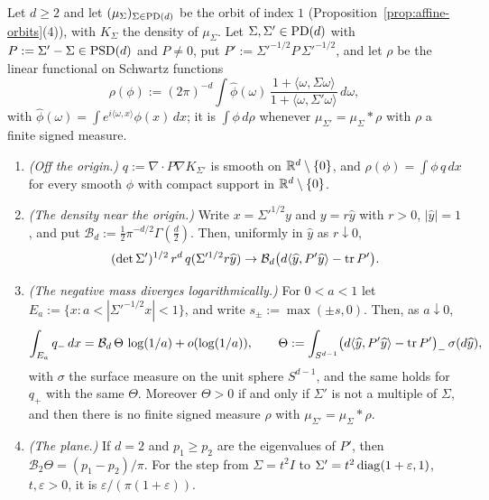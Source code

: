 \begin{proposition}\label{prop:matern-negative-mass}
Let $d \ge 2$ and let $(\mu_\Sigma)_{\Sigma\in\mathrm{PD}(d)}$ be the \Matern{} orbit of index $1$
(Proposition~\ref{prop:affine-orbits}(4)), with $K_\Sigma$ the density of $\mu_\Sigma$. Let
$\Sigma, \Sigma' \in \mathrm{PD}(d)$ with $P := \Sigma' - \Sigma \in \mathrm{PSD}(d)$ and $P \ne 0$, put
$P' := \Sigma'^{-1/2}P\,\Sigma'^{-1/2}$, and let $\rho$ be the linear functional on Schwartz
functions
\[
  \rho(\phi) := (2\pi)^{-d}\int\widehat\phi(\omega)\,
   \frac{1 + \langle\omega,\Sigma\omega\rangle}{1 + \langle\omega,\Sigma'\omega\rangle}\,d\omega ,
\]
with $\widehat\phi(\omega) = \int e^{i\langle\omega,x\rangle}\phi(x)\,dx$; it is $\int\phi\,d\rho$
whenever $\mu_{\Sigma'} = \mu_\Sigma * \rho$ with $\rho$ a finite signed measure.
\begin{enumerate}
\item \emph{(Off the origin.)} $q := \nabla\cdot P\nabla K_{\Sigma'}$ is smooth on
$\mathbb{R}^d \setminus \{0\}$, and $\rho(\phi) = \int\phi\,q\,dx$ for every smooth $\phi$ with compact
support in $\mathbb{R}^d \setminus \{0\}$.
\item \emph{(The density near the origin.)} Write $x = \Sigma'^{1/2}y$ and $y = r\widehat y$ with
$r > 0$, $|\widehat y| = 1$, and put $\mathcal{B}_d := \tfrac12\pi^{-d/2}\Gamma(\tfrac d2)$. Then,
uniformly in $\widehat y$ as $r \downarrow 0$,
\[
  (\det\Sigma')^{1/2}\,r^d\,q(\Sigma'^{1/2}r\widehat y) \to
  \mathcal{B}_d\bigl(d\langle\widehat y,P'\widehat y\rangle - \operatorname{tr} P'\bigr) .
\]
\item \emph{(The negative mass diverges logarithmically.)} For $0 < a < 1$ let
$E_a := \{x : a < |\Sigma'^{-1/2}x| < 1\}$, and write $s_\pm := \max(\pm s, 0)$. Then, as
$a \downarrow 0$,
\[
  \int_{E_a}q_-\,dx = \mathcal{B}_d\,\Theta\,\log(1/a) + o(\log(1/a)) , \qquad
  \Theta := \int_{S^{d-1}}\bigl(d\langle\widehat y,P'\widehat y\rangle - \operatorname{tr} P'\bigr)_-\,\sigma(d\widehat y) ,
\]
with $\sigma$ the surface measure on the unit sphere $S^{d-1}$, and the same holds for $q_+$ with
the same $\Theta$. Moreover $\Theta > 0$ if and only if $\Sigma'$ is not a multiple of $\Sigma$, and
then there is no finite signed measure $\rho$ with $\mu_{\Sigma'} = \mu_\Sigma * \rho$.
\item \emph{(The plane.)} If $d = 2$ and $p_1 \ge p_2$ are the eigenvalues of $P'$, then
$\mathcal{B}_2\Theta = (p_1 - p_2)/\pi$. For the step from $\Sigma = t^2I$ to
$\Sigma' = t^2\operatorname{diag}(1+\varepsilon, 1)$, $t, \varepsilon > 0$, it is $\varepsilon/(\pi(1+\varepsilon))$.
\end{enumerate}
\end{proposition}

